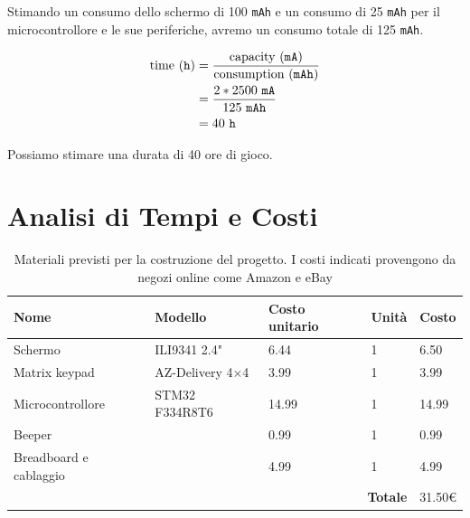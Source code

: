 \documentclass[a4paper]{article}
\begin{document}
Stimando un consumo dello schermo di 100 \texttt{mAh} e un consumo di 25 \texttt{mAh} per il microcontrollore e le sue periferiche, avremo un consumo totale di 125 \texttt{mAh}.

\begin{equation*}
    \begin{aligned}
        \textmd{time} \ (\texttt{h}) & = \frac{\textmd{capacity} \ (\texttt{mA})}{\textmd{consumption} \ (\texttt{mAh})}\\
                                     & = \frac{2 * 2500 \ \texttt{mA}}{125 \ \texttt{mAh}}\\
                                     & = 40 \ \texttt{h}
    \end{aligned}
\end{equation*}

Possiamo stimare una durata di 40 ore di gioco.

\section{Analisi di Tempi e Costi}

\begin{center}
	\begin{table}[ht]
		\centering
		\begin{tabular}{|llll|l|}
			\hline
			\multicolumn{1}{|l|}{\textbf{Nome}}                   & \multicolumn{1}{l|}{\textbf{Modello}}       & \multicolumn{1}{l|}{\textbf{Costo unitario}} & \textbf{Unità} & \textbf{Costo} \\ \hline
			\multicolumn{1}{|l|}{Schermo}                & \multicolumn{1}{l|}{ILI9341 2.4"}           & \multicolumn{1}{l|}{6.44}                    & 1               & 6.50           \\ \hline
			\multicolumn{1}{|l|}{Matrix keypad}          & \multicolumn{1}{l|}{AZ-Delivery 4$\times$4}        & \multicolumn{1}{l|}{3.99}                    & 1               & 3.99           \\ \hline
			\multicolumn{1}{|l|}{Microcontrollore}       & \multicolumn{1}{l|}{STM32 F334R8T6}         & \multicolumn{1}{l|}{14.99}                   & 1               & 14.99          \\ \hline
			\multicolumn{1}{|l|}{Beeper}                 & \multicolumn{1}{l|}{}                       & \multicolumn{1}{l|}{0.99}                    & 1               & 0.99           \\ \hline
			\multicolumn{1}{|l|}{Breadboard e cablaggio} & \multicolumn{1}{l|}{}                       & \multicolumn{1}{l|}{4.99}                    & 1               & 4.99           \\ \hline
			\multicolumn{4}{|r|}{\textbf{Totale}}                                                                                                            & 31.50\euro        \\ \hline
		\end{tabular}
		\caption{
			Materiali previsti per la costruzione del progetto. I costi indicati
			provengono da negozi online come Amazon e eBay
		}
	\end{table}
\end{center}
\end{document}
